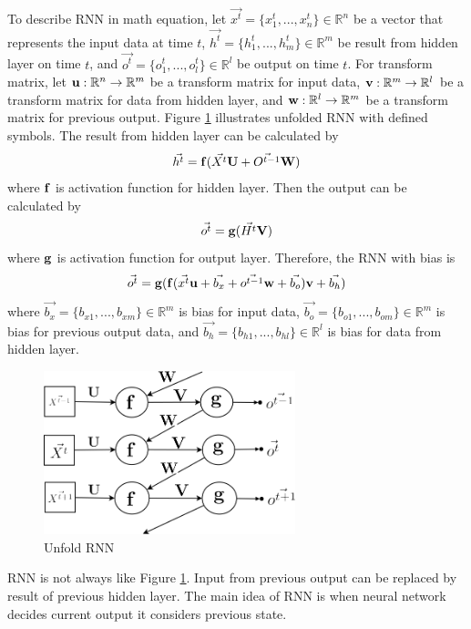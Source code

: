 \documentclass[draft,dvipsnames]{drexel-thesis}
\begin{document}
\begin{thesis}
	To describe RNN in math equation, let $\vec{x^t} = \{ x_1^t, ..., x_n^t\} \in \mathbb{R}^n$ be a vector that represents the input data at time $t$, $\vec{h^t} = \{ h_1^t, ..., h_m^t\} \in \mathbb{R}^m$ be result from hidden layer on time $t$, and $\vec{o^t} = \{ o_1^t, ..., o_l^t\} \in \mathbb{R}^l$ be output on time $t$. For transform matrix, let $\bold{u}: \mathbb{R}^n \rightarrow \mathbb{R}^m$ be a transform matrix for input data, $\bold{v}: \mathbb{R}^m \rightarrow \mathbb{R}^l$ be a transform matrix for data from hidden layer, and $\bold{w}: \mathbb{R}^l \rightarrow \mathbb{R}^m$ be a transform matrix for previous output. Figure \ref{fig:unfold_RNN} illustrates unfolded RNN with defined symbols. The result from hidden layer can be calculated by
	$$\vec{h^t} = \bold{f}(\vec{X^t}\bold{U} + \vec{O^{t-1}}\bold{W})$$ where $\bold{f}$ is activation function for hidden layer. Then the output can be calculated by
	$$\vec{o^t} = \bold{g}(\vec{H^t}\bold{V})$$ where $\bold{g}$ is activation function for output layer. Therefore, the RNN with bias is
	$$\vec{o^t} = \bold{g}(\bold{f}(\vec{x^t}\bold{u}+\vec{b_x} + \vec{o^{t-1}}\bold{w}+\vec{b_o})\bold{v}+\vec{b_h})$$ where $\vec{b_x} = \{b_{x1}, ..., b_{xm}\} \in \mathbb{R}^m$ is bias for input data, $\vec{b_o} = \{b_{o1}, ..., b_{om}\} \in \mathbb{R}^m$ is bias for previous output data, and $\vec{b_h} = \{b_{h1}, ..., b_{hl}\} \in \mathbb{R}^l$ is bias for data from hidden layer.

\begin{figure}[t!]
    \centering
    \includegraphics[width=0.65\textwidth]{pictures/figures/unfold_RNN.png}
    \caption{Unfold RNN}
    \label{fig:unfold_RNN}
\end{figure}

	RNN is not always like Figure \ref{fig:unfold_RNN}. Input from previous output can be replaced by result of previous hidden layer. The main idea of RNN is when neural network decides current output it considers previous state.



\end{thesis}
\end{document}
